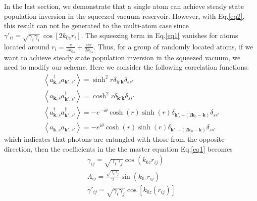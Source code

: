 \documentclass[aps,showpacs,twocolumn,twoside,groupedaddress]{revtex4}
\let\vec\bm
\begin{document}


In the last section, we demonstrate that a single atom can achieve steady state population inversion in the squeezed vacuum reservoir. However, with Eq.\eqref{eq2}, this result can not be generated to the multi-atom case since $\gamma'_{ii}=\sqrt{\gamma_{i}\gamma_{i}}\cos[2k_{0z}r_{i}]$. The squeezing term in Eq.\eqref{eq1} vanishes for atoms located around $r_i=\frac{\pi}{4k_{0z}}+\frac{n\pi}{2k_{0z}}$. Thus, for a group of randomly located atoms, if we want to achieve steady state population inversion in the squeezed vacuum, we need to modify our scheme. Here we consider the following correlation functions:
\begin{equation}
\label{eq0b}
\begin{split}
& \left\langle a_{\vec{k},s}^{\dagger}a_{\vec{k}',s'}\right\rangle =\sinh^{2}r\delta_{\vec{k}'\vec{k}}\delta_{ss'} \\
& \left\langle a_{\vec{k},s}a_{\vec{k}',s'}^{\dagger}\right\rangle =\cosh^{2}r\delta_{\vec{k}'\vec{k}}\delta_{ss'}\\
& \left\langle a_{\vec{k},s}^{\dagger}a_{\vec{k}',s'}^{\dagger}\right\rangle =-e^{-i\theta}\cosh(r)\sinh(r)\delta_{\vec{k}',-(2\vec{k}_{0}-\vec{k})}\delta_{ss'}\\
&\left\langle a_{\vec{k},s}a_{\vec{k}',s'}\right\rangle =-e^{i\theta}\cosh(r)\sinh(r)\delta_{\vec{k}',-(2\vec{k}_{0}-\vec{k})}\delta_{ss'}
\end{split}
\end{equation}
which indicates that photons are entangled with those from the opposite direction, then the coefficients in the the master equation Eq.\eqref{eq1} becomes 
\begin{equation}
\label{eq2b}
\begin{split}
& \gamma_{ij}=\sqrt{\gamma_{i}\gamma_{j}}\cos(k_{0z}r_{ij}) \\
& \Lambda_{ij}=\frac{\sqrt{\gamma_{i}\gamma_{j}}}{2}\sin(k_{0z}r_{ij})\\
& \gamma'_{ij}=\sqrt{\gamma_{i}\gamma_{j}}\cos[k_{0z}(r_{ij})]
\end{split}
\end{equation}
\end{document}
